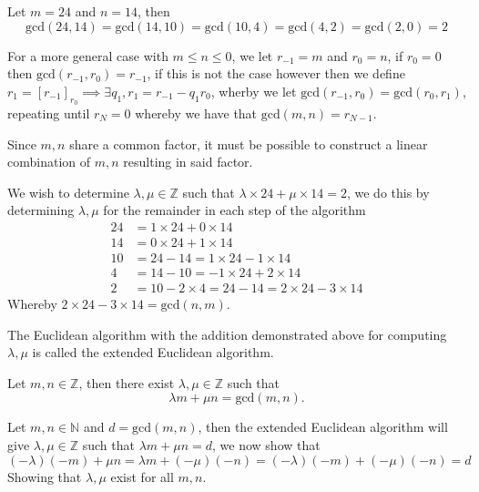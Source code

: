 \begin{exmp}
    Let $m=24$ and $n=14$, then
    \[
        \text{gcd}(24,14)=\text{gcd}(14,10)=\text{gcd}(10,4)=\text{gcd}(4,2)=\text{gcd}(2,0)=2
    \]\vskip -10pt
\end{exmp}
For a more general case with $m\leq n\leq 0$, we let $r_{-1}=m$ and $r_{0}=n$, if $r_{0}=0$ then $\text{gcd}(r_{-1},r_{0})=r_{-1}$, if this is not the case however then we define $r_{1}=[r_{-1}]_{r_{0}}\implies \exists q_{1},r_{1}=r_{-1}-q_{1}r_{0}$, wherby we let $\text{gcd}(r_{-1},r_{0})=\text{gcd}(r_{0},r_{1})$, repeating until $r_{N}=0$ whereby we have that $\text{gcd}(m,n)=r_{N-1}$.

Since $m,n$ share a common factor, it must be possible to construct a linear combination of $m,n$ resulting in said factor.
\begin{exmp}
    We wish to determine $\lambda,\mu\in\mathbb{Z}$ such that $\lambda\times 24+\mu\times 14=2$, we do this by determining $\lambda,\mu$ for the remainder in each step of the algorithm
    \begin{align*}
        24&=1\times 24+0\times 14 \\
        14&=0\times 24+1\times 14 \\
        10&=24-14=1\times 24-1\times 14 \\
        4&=14-10=-1\times 24+2\times 14 \\
        2&=10-2\times 4=24-14=2\times 24-3\times 14
    \end{align*}
    Whereby $2\times 24-3\times 14=\text{gcd}(n,m)$.
\end{exmp}
\begin{defi}
    The Euclidean algorithm with the addition demonstrated above for computing $\lambda,\mu$ is called the extended Euclidean algorithm.
\end{defi}
\begin{lemm}
    Let $m,n\in\mathbb{Z}$, then there exist $\lambda,\mu\in\mathbb{Z}$ such that
    \[
        \lambda m+\mu n=\text{gcd}(m,n)
    .\]\vskip -10pt
\end{lemm}
\begin{prf}
    Let $m,n\in\mathbb{N}$ and $d=\text{gcd}(m,n)$, then the extended Euclidean algorithm will give $\lambda,\mu\in\mathbb{Z}$ such that $\lambda m+\mu n=d$, we now show that
    \[
        (-\lambda)(-m)+\mu n=\lambda m+(-\mu)(-n)=(-\lambda)(-m)+(-\mu)(-n)=d
    \]
    Showing that $\lambda,\mu$ exist for all $m,n$.
\end{prf}\vskip -10pt
